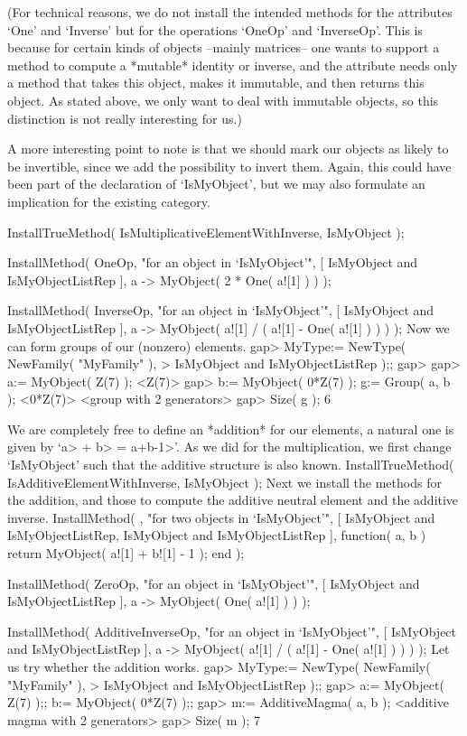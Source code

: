 (For technical reasons, we do not install the intended methods for
the attributes `One' and `Inverse' but for the operations `OneOp'
and `InverseOp'.
This is because for certain kinds of objects --mainly matrices--
one wants to support a method to compute a *mutable* identity or
inverse, and the attribute needs only a method that takes this
object, makes it immutable, and then returns this object.
As stated above, we only want to deal with immutable objects,
so this distinction is not really interesting for us.)

A more interesting point to note is that we should mark our objects
as likely to be invertible,
since we add the possibility to invert them.
Again, this could have been part of the declaration of `IsMyObject',
but we may also formulate an implication for the existing category.

\begintt
InstallTrueMethod( IsMultiplicativeElementWithInverse, IsMyObject );

InstallMethod( OneOp,
    "for an object in `IsMyObject'",
    [ IsMyObject and IsMyObjectListRep ],
    a -> MyObject( 2 * One( a![1] ) ) );

InstallMethod( InverseOp,
    "for an object in `IsMyObject'",
    [ IsMyObject and IsMyObjectListRep ],
    a -> MyObject( a![1] / ( a![1] - One( a![1] ) ) ) );
\endtt
Now we can form groups of our (nonzero) elements.
\begintt
gap> MyType:= NewType( NewFamily( "MyFamily" ),
>                   IsMyObject and IsMyObjectListRep );;
gap> 
gap> a:= MyObject( Z(7) );
<Z(7)>
gap> b:= MyObject( 0*Z(7) );  g:= Group( a, b );
<0*Z(7)>
<group with 2 generators>
gap> Size( g );
6
\endtt

We are completely free to define an *addition* for our elements,
a natural one is given by `\<a> + \<b> = \<a+b-1>'.
As we did for the multiplication, we first change `IsMyObject'
such that the additive structure is also known.
\begintt
InstallTrueMethod( IsAdditiveElementWithInverse, IsMyObject );
\endtt
Next we install the methods for the addition,
and those to compute the additive neutral element
and the additive inverse.
\begintt
InstallMethod( \+,
    "for two objects in `IsMyObject'",
    [ IsMyObject and IsMyObjectListRep,
      IsMyObject and IsMyObjectListRep ],
    function( a, b )
    return MyObject( a![1] + b![1] - 1 );
    end );

InstallMethod( ZeroOp,
    "for an object in `IsMyObject'",
    [ IsMyObject and IsMyObjectListRep ],
    a -> MyObject( One( a![1] ) ) );

InstallMethod( AdditiveInverseOp,
    "for an object in `IsMyObject'",
    [ IsMyObject and IsMyObjectListRep ],
    a -> MyObject( a![1] / ( a![1] - One( a![1] ) ) ) );
\endtt
Let us try whether the addition works.
\begintt
gap> MyType:= NewType( NewFamily( "MyFamily" ),
>                   IsMyObject and IsMyObjectListRep );;
gap> a:= MyObject( Z(7) );;  b:= MyObject( 0*Z(7) );;
gap> m:= AdditiveMagma( a, b );
<additive magma with 2 generators>
gap> Size( m );
7
\endtt

